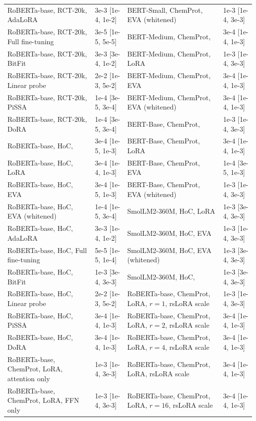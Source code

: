 \begin{table}[!ht]
\begin{tabular}{llll}
RoBERTa-base, RCT-20k, AdaLoRA & 3e-3 [1e-4, 1e-2] & BERT-Small, ChemProt, EVA (whitened) & 1e-3 [1e-4, 3e-3] \\
RoBERTa-base, RCT-20k, Full fine-tuning & 3e-5 [1e-5, 5e-5] & BERT-Medium, ChemProt, \method{} & 3e-4 [1e-4, 1e-3] \\
RoBERTa-base, RCT-20k, BitFit & 3e-3 [3e-4, 1e-2] & BERT-Medium, ChemProt, LoRA & 1e-3 [1e-4, 3e-3] \\
RoBERTa-base, RCT-20k, Linear probe & 2e-2 [1e-3, 5e-2] & BERT-Medium, ChemProt, EVA & 3e-4 [1e-4, 1e-3] \\
RoBERTa-base, RCT-20k, PiSSA & 1e-4 [3e-5, 3e-4] & BERT-Medium, ChemProt, EVA (whitened) & 3e-4 [1e-4, 1e-3] \\
RoBERTa-base, RCT-20k, DoRA & 1e-4 [3e-5, 3e-4] & BERT-Base, ChemProt, \method{} & 1e-3 [1e-4, 3e-3] \\
RoBERTa-base, HoC, \method{} & 3e-4 [1e-5, 1e-3] & BERT-Base, ChemProt, LoRA & 3e-4 [1e-4, 1e-3] \\
RoBERTa-base, HoC, LoRA & 3e-4 [1e-4, 1e-3] & BERT-Base, ChemProt, EVA & 1e-4 [3e-5, 1e-3] \\
RoBERTa-base, HoC, EVA & 3e-4 [1e-5, 1e-3] & BERT-Base, ChemProt, EVA (whitened) & 1e-3 [1e-4, 3e-3] \\
RoBERTa-base, HoC, EVA (whitened) & 1e-4 [1e-5, 3e-4] & SmolLM2-360M, HoC, LoRA & 1e-3 [3e-4, 3e-3] \\
RoBERTa-base, HoC, AdaLoRA & 3e-3 [1e-4, 1e-2] & SmolLM2-360M, HoC, EVA & 1e-3 [1e-4, 3e-3] \\
RoBERTa-base, HoC, Full fine-tuning & 5e-5 [1e-5, 1e-4] & SmolLM2-360M, HoC, EVA (whitened) & 1e-3 [3e-4, 3e-3] \\
RoBERTa-base, HoC, BitFit & 1e-3 [3e-4, 3e-3] & SmolLM2-360M, HoC, \method{} & 1e-3 [3e-4, 3e-3] \\
RoBERTa-base, HoC, Linear probe & 2e-2 [1e-3, 5e-2] & RoBERTa-base, ChemProt, LoRA, $r{=}1$, rsLoRA scale & 1e-3 [1e-4, 3e-3] \\
RoBERTa-base, HoC, PiSSA & 3e-4 [1e-4, 1e-3] & RoBERTa-base, ChemProt, LoRA, $r{=}2$, rsLoRA scale & 3e-4 [1e-4, 1e-3] \\
RoBERTa-base, HoC, DoRA & 3e-4 [1e-4, 1e-3] & RoBERTa-base, ChemProt, LoRA, $r{=}4$, rsLoRA scale & 3e-4 [1e-4, 1e-3] \\
RoBERTa-base, ChemProt, LoRA, attention only & 1e-3 [1e-4, 3e-3] & RoBERTa-base, ChemProt, LoRA, rsLoRA scale & 3e-4 [1e-4, 1e-3] \\
RoBERTa-base, ChemProt, LoRA, FFN only & 1e-3 [1e-4, 3e-3] & RoBERTa-base, ChemProt, LoRA, $r{=}16$, rsLoRA scale & 3e-4 [1e-4, 1e-3] \\

\end{tabular}
\end{table}
